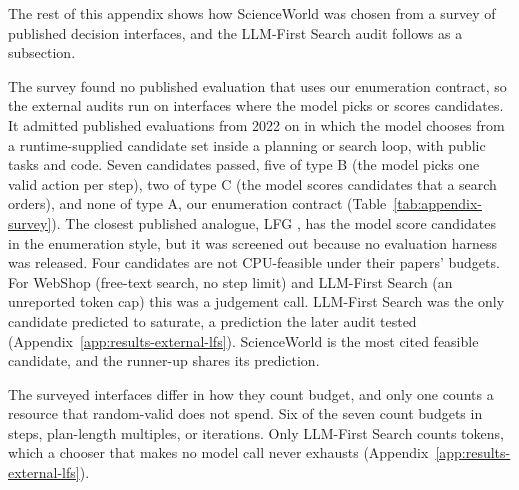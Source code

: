 The rest of this appendix shows how ScienceWorld was chosen from a survey of published decision interfaces, and the LLM-First Search audit follows as a subsection.

The survey found no published evaluation that uses our enumeration contract, so the external audits run on interfaces where the model picks or scores candidates. It admitted published evaluations from 2022 on in which the model chooses from a runtime-supplied candidate set inside a planning or search loop, with public tasks and code. Seven candidates passed, five of type B (the model picks one valid action per step), two of type C (the model scores candidates that a search orders), and none of type A, our enumeration contract (Table~\ref{tab:appendix-survey}). The closest published analogue, LFG \citep{shah2023lfg}, has the model score candidates in the enumeration style, but it was screened out because no evaluation harness was released. Four candidates are not CPU-feasible under their papers' budgets. For WebShop (free-text search, no step limit) and LLM-First Search (an unreported token cap) this was a judgement call. LLM-First Search was the only candidate predicted to saturate, a prediction the later audit tested (Appendix~\ref{app:results-external-lfs}). ScienceWorld is the most cited feasible candidate, and the runner-up shares its prediction.

The surveyed interfaces differ in how they count budget, and only one counts a resource that random-valid does not spend. Six of the seven count budgets in steps, plan-length multiples, or iterations. Only LLM-First Search counts tokens, which a chooser that makes no model call never exhausts (Appendix~\ref{app:results-external-lfs}).

